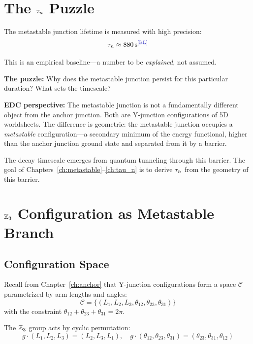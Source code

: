 \section{The $\tau_n$ Puzzle}
\label{sec:metastable:puzzle}

The metastable junction lifetime is measured with high precision:
\begin{equation}
    \taun \approx 880 \second \tagBL
    \label{eq:tau_n_baseline}
\end{equation}

This is an empirical baseline---a number to be \emph{explained}, not assumed.

\textbf{The puzzle:} Why does the metastable junction persist for this particular duration?
What sets the timescale?

\textbf{EDC perspective:} The metastable junction is not a fundamentally different object
from the anchor junction. Both are Y-junction configurations of 5D worldsheets. The
difference is geometric: the metastable junction occupies a \emph{metastable} configuration---a
secondary minimum of the energy functional, higher than the anchor junction ground state
and separated from it by a barrier.

The decay timescale emerges from quantum tunneling through this barrier. The
goal of Chapters~\ref{ch:metastable}--\ref{ch:tau_n} is to derive $\tau_n$ from
the geometry of this barrier.

\section{$\mathbb{Z}_3$ Configuration as Metastable Branch}
\label{sec:metastable:z3}

\subsection{Configuration Space}

Recall from Chapter~\ref{ch:anchor} that Y-junction configurations form a
space $\mathcal{C}$ parametrized by arm lengths and angles:
\begin{equation}
    \mathcal{C} = \{(L_1, L_2, L_3, \theta_{12}, \theta_{23}, \theta_{31})\}
\end{equation}
with the constraint $\theta_{12} + \theta_{23} + \theta_{31} = 2\pi$.

The $\mathbb{Z}_3$ group acts by cyclic permutation:
\begin{equation}
    g \cdot (L_1, L_2, L_3) = (L_2, L_3, L_1), \quad
    g \cdot (\theta_{12}, \theta_{23}, \theta_{31}) = (\theta_{23}, \theta_{31}, \theta_{12})
\end{equation}

